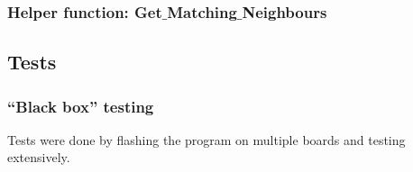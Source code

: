 

\subsubsection{Helper function: Get$\_$Matching$\_$Neighbours}



\subsection{Tests}

\subsubsection{``Black box'' testing}
Tests were done by flashing the program on multiple boards and testing extensively.

\newpage
